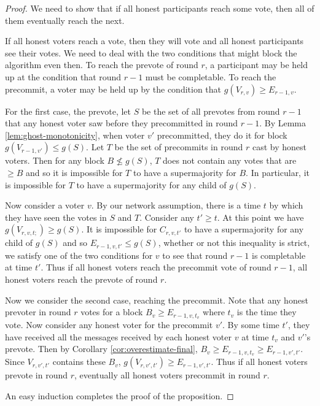 \documentclass{article}
\begin{document}
\begin{proof} We need to show that if all honest participants reach some vote, then all of them eventually reach the next.

If all honest voters reach a vote, then they will vote and all honest participants see their votes. We need to deal with the two conditions that might block the algorithm even then.
To reach the prevote of round $r$, a participant may be held up at the condition that round $r-1$ must be completable. To reach the precommit, a voter may be held up by the condition that $g(V_{r,v}) \geq E_{r-1,v}$.

For the first case, the prevote, let $S$ be the set of all prevotes from round $r-1$ that any honest voter saw before they precommitted in round $r-1$.
By Lemma \ref{lem:ghost-monotonicity}, when voter $v'$ precommitted, they do it for block $g(V_{r-1,v'}) \leq g(S)$.
Let $T$ be the set of precommits in round $r$ cast by honest voters.
Then for any block $B \not\leq g(S)$, $T$ does not contain any votes that are $\geq B$ and so it is impossible for $T$ to have a supermajority for $B$.
In particular, it is impossible for $T$ to have a supermajority for any child of $g(S)$. 

Now consider a voter $v$. By our network assumption, there is a time $t$ by which they have seen the votes in $S$ and $T$. Consider any $t' \geq t$.
At this point we have $g(V_{r,v,t;}) \geq g(S)$. It is impossible for $C_{r,v,t'}$ to have a supermajority for any child of $g(S)$ and so $E_{r-1,v,t'} \leq g(S)$, whether or not this inequality is strict, we satisfy one of the two conditions for $v$ to see that round $r-1$ is completable at time $t'$.
Thus if all honest voters reach the precommit vote of round $r-1$, all honest voters reach the prevote of round $r$.

Now we consider the second case, reaching the precommit. 
Note that any honest prevoter in round $r$ votes for a block $B_v \geq E_{r-1,v,t_v}$ where $t_v$ is the time they vote. Now consider any honest voter for the precommit $v'$. By some time $t'$, they have received all the messages received by each honest voter $v$ at time $t_v$ and $v'$'s prevote. 
Then by Corollary \ref{cor:overestimate-final}, $B_v \geq E_{r-1,v,t_v} \geq E_{r-1,v',t'}$. Since $V_{r,v',t'}$ contains these $B_v$, $g(V_{r,v',t'}) \geq  E_{r-1,v',t'}$. Thus if all honest voters prevote in round $r$, eventually all honest voters precommit in round $r$.

An easy induction completes the proof of the proposition.
\end{proof}
\end{document}
